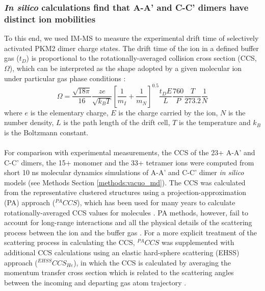 \subsubsection{\textit{In silico} calculations find that A-A' and C-C' dimers have distinct ion mobilities}
To this end, we used IM-MS to measure the experimental drift time of selectively activated PKM2 dimer charge states. The drift time of the ion in a defined buffer gas ($t_{D}$) is proportional to the rotationally-averaged collision cross section (CCS, $\Omega$), which can be interpreted as the shape adopted by a given molecular ion under particular gas phase conditions \cite{Jurneczko:2011aa}:
%
%
\begin{equation}
\Omega = \frac{ \sqrt{18 \pi }}{16} \frac{ze}{\sqrt{k_{B}T}} \left[ \frac{1}{m_{I}} + \frac{1}{m_{N}} \right]^{0.5} \frac{t_{D}E}{L} \frac{760}{P} \frac{T}{273.2} \frac{1}{N}
\end{equation}
%
%
where $e$ is the elementary charge, $E$ is the charge carried by the ion, $N$ is the number density, $L$ is the path length of the drift cell, $T$ is the temperature and $k_{B}$ is the Boltzmann constant.
%
%
\\\\
%
%
For comparison with experimental measurements, the CCS of the 23+ A-A' and C-C' dimers, the 15+ monomer and the 33+ tetramer ions were computed from short 10 ns molecular dynamics simulations of A-A' and C-C' dimer \textit{in silico} models (see Methods Section \ref{methods:vacuo_md}). The CCS was calculated from the representative clustered structures using a projection-approximation (PA) approach ($^{PA}CCS$), which has been used for many years to calculate rotationally-averaged CCS values for molecules \cite{Jurneczko:2011aa}. PA methods, however, fail to account for long-range interactions and all the physical details of the scattering process between the ion and the buffer gas \cite{Jurneczko:2011aa}. For a more explicit treatment of the scattering process in calculating the CCS, $^{PA}CCS$ was supplemented with additional CCS calculations using an elastic hard-sphere scattering (EHSS) approach ($^{EHSS}CCS_{He}$), in which the CCS is calculated by averaging the momentum transfer cross section which is related to the scattering angles between the incoming and departing gas atom trajectory \cite{Jurneczko:2011aa}. 

